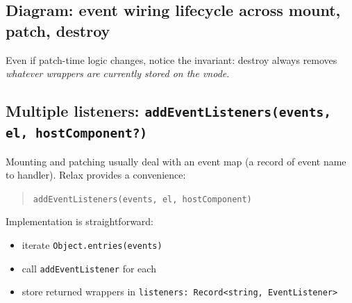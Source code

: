 \subsection*{Diagram: event wiring lifecycle across mount, patch, destroy}
\begin{center}
\end{center}

Even if patch-time logic changes, notice the invariant: destroy always removes \emph{whatever wrappers are currently stored on the vnode}.

\subsection{Multiple listeners: \texttt{addEventListeners(events, el, hostComponent?)}}
Mounting and patching usually deal with an event map (a record of event name to handler). Relax provides a convenience:

\begin{quote}
    \texttt{addEventListeners(events, el, hostComponent)}
\end{quote}

Implementation is straightforward:

\begin{itemize}
  \item iterate \texttt{Object.entries(events)}
  \item call \texttt{addEventListener} for each
  \item store returned wrappers in \texttt{listeners: Record<string, EventListener>}
\end{itemize}

